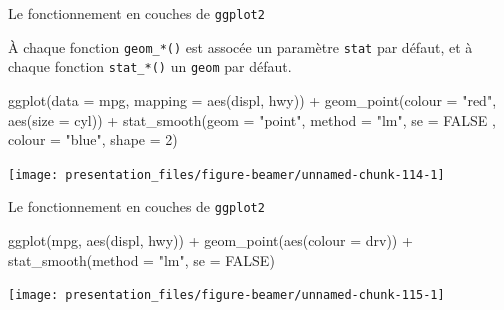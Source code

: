 \documentclass[12pt,handout,ignorenonframetext,]{beamer}
\newenvironment{Shaded}{}{}
\newcommand{\KeywordTok}[1]{\textcolor[rgb]{0.00,0.00,1.00}{{#1}}}
\newcommand{\DataTypeTok}[1]{{#1}}
\newcommand{\DecValTok}[1]{{#1}}
\newcommand{\StringTok}[1]{\textcolor[rgb]{0.00,0.50,0.50}{{#1}}}
\newcommand{\OtherTok}[1]{\textcolor[rgb]{1.00,0.25,0.00}{{#1}}}
\newcommand{\NormalTok}[1]{{#1}}
\renewenvironment{Shaded}{\begin{snugshade}}{\end{snugshade}}
\begin{document}
\begin{frame}[fragile]{\large Le fonctionnement en \og couches \fg{} de
\texttt{ggplot2}}

À chaque fonction \texttt{geom\_*()} est assocée un paramètre
\texttt{stat} par défaut, et à chaque fonction \texttt{stat\_*()} un
\texttt{geom} par défaut.

\footnotesize \center

\begin{Shaded}
\begin{Highlighting}[]
\KeywordTok{ggplot}\NormalTok{(}\DataTypeTok{data =} \NormalTok{mpg, }\DataTypeTok{mapping =} \KeywordTok{aes}\NormalTok{(displ, hwy)) +}\StringTok{ }
\StringTok{  }\KeywordTok{geom_point}\NormalTok{(}\DataTypeTok{colour =} \StringTok{"red"}\NormalTok{, }\KeywordTok{aes}\NormalTok{(}\DataTypeTok{size =} \NormalTok{cyl)) +}\StringTok{ }
\StringTok{  }\KeywordTok{stat_smooth}\NormalTok{(}\DataTypeTok{geom =} \StringTok{"point"}\NormalTok{, }\DataTypeTok{method =} \StringTok{"lm"}\NormalTok{, }\DataTypeTok{se =} \OtherTok{FALSE}
    \NormalTok{, }\DataTypeTok{colour =} \StringTok{"blue"}\NormalTok{, }\DataTypeTok{shape =} \DecValTok{2}\NormalTok{)}
\end{Highlighting}
\end{Shaded}

\texttt{[image: presentation\_files/figure-beamer/unnamed-chunk-114-1]}

\end{frame}

\begin{frame}[fragile]{\large Le fonctionnement en \og couches \fg{} de
\texttt{ggplot2}}

\footnotesize \center

\begin{Shaded}
\begin{Highlighting}[]
\KeywordTok{ggplot}\NormalTok{(mpg, }\KeywordTok{aes}\NormalTok{(displ, hwy)) +}\StringTok{ }
\StringTok{  }\KeywordTok{geom_point}\NormalTok{(}\KeywordTok{aes}\NormalTok{(}\DataTypeTok{colour =} \NormalTok{drv)) +}\StringTok{ }
\StringTok{  }\KeywordTok{stat_smooth}\NormalTok{(}\DataTypeTok{method =} \StringTok{"lm"}\NormalTok{, }\DataTypeTok{se =} \OtherTok{FALSE}\NormalTok{)}
\end{Highlighting}
\end{Shaded}

\texttt{[image: presentation\_files/figure-beamer/unnamed-chunk-115-1]}

\end{frame}
\end{document}
